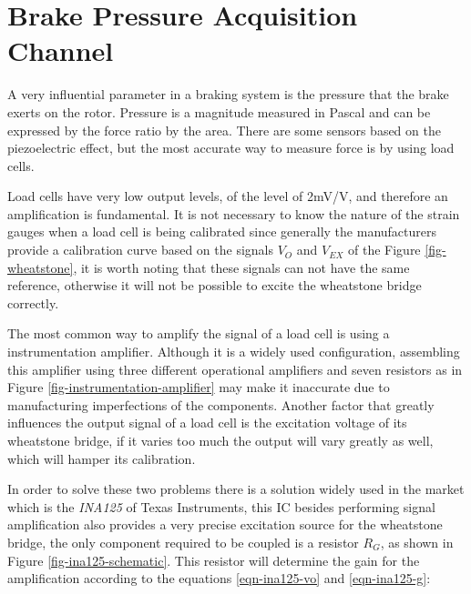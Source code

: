 \section{Brake Pressure Acquisition Channel}

	A very influential parameter in a braking system is the pressure that the brake exerts on the rotor. Pressure is a magnitude measured in Pascal and can be expressed by the force ratio by the area. There are some sensors based on the piezoelectric effect, but the most accurate way to measure force is by using load cells.

	Load cells have very low output levels, of the level of 2mV/V, and therefore an amplification is fundamental. It is not necessary to know the nature of the strain gauges when a load cell is being calibrated since generally the manufacturers provide a calibration curve based on the signals $V_{O}$ and $V_{EX}$ of the Figure \ref{fig-wheatstone}, it is worth noting that these signals can not have the same reference, otherwise it will not be possible to excite the wheatstone bridge correctly. 

	The most common way to amplify the signal of a load cell is using a instrumentation amplifier. Although it is a widely used configuration, assembling this amplifier using three different operational amplifiers and seven resistors as in Figure \ref{fig-instrumentation-amplifier} may make it inaccurate due to manufacturing imperfections of the components. Another factor that greatly influences the output signal of a load cell is the excitation voltage of its wheatstone bridge, if it varies too much the output will vary greatly as well, which will hamper its calibration.
		
	In order to solve these two problems there is a solution widely used in the market which is the \textit{INA125} of Texas Instruments, this IC besides performing signal amplification also provides a very precise excitation source for the wheatstone bridge, the only component required to be coupled is a resistor $R_{G}$, as shown in Figure \ref{fig-ina125-schematic}. This resistor will determine the gain for the amplification according to the equations \ref{eqn-ina125-vo} and \ref{eqn-ina125-g}:
	

